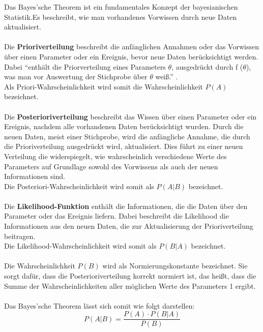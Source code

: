 \documentclass[a4paper,12pt]{article}
\begin{document}
Das Bayes'sche Theorem ist ein fundamentales Konzept der bayesianischen Statistik.Es beschreibt, wie man vorhandenes Vorwissen durch neue Daten aktualisiert. \\\\
Die \textbf{Prioriverteilung} beschreibt die anfänglichen Annahmen oder das Vorwissen über einen 
Parameter oder ein Ereignis, bevor neue Daten berücksichtigt werden.
Dabei ``enthält die Priorverteilung eines Parameters $\theta$, ausgedrückt durch f ($ \theta $), 
was man vor Auswertung der Stichprobe über $\theta$ weiß.'' \parencite[90]{StatistikKlassischOderBayes}. \\
Als Priori-Wahrscheinlichkeit wird somit die Wahrscheinlichkeit $ P(A) $ bezeichnet. \\\\
Die \textbf{Posterioriverteilung} beschreibt das Wissen über einen Parameter oder ein Ereignis, nachdem alle 
vorhandenen Daten berücksichtigt wurden. Durch die neuen Daten, meist einer Stichprobe, wird die 
anfängliche Annahme, die durch die Prioriverteilung ausgedrückt wird, aktualisiert. 
Dies führt zu einer neuen Verteilung die widerspiegelt, wie wahrscheinlich verschiedene Werte 
des Parameters auf Grundlage sowohl des Vorwissens als auch der neuen Informationen sind. \parencite[109]{StatistikKlassischOderBayes}\\
Die Posteriori-Wahrscheinlichkeit wird somit als $ P(A|B) $ bezeichnet. \\\\
Die \textbf{Likelihood-Funktion} enthält die Informationen, die die Daten über den Parameter oder das Ereignis liefern.
Dabei beschreibt die Likelihood die Informationen aus den neuen Daten, die zur Aktualisierung der Prioriverteilung beitragen. \parencite[88]{StatistikKlassischOderBayes}\\
Die Likelihood-Wahrscheinlichkeit wird somit als $ P(B|A) $ bezeichnet. \\\\
Die Wahrscheinlichkeit $ P(B) $ wird als Normierungskonstante bezeichnet. Sie sorgt dafür, 
dass die Posterioriverteilung korrekt normiert ist, das heißt, dass die Summe der 
Wahrscheinlichkeiten aller möglichen Werte des Parameters 1 ergibt. \parencite[109]{StatistikKlassischOderBayes} \\\\
Das Bayes'sche Theorem lässt sich somit wie folgt darstellen:
\begin{equation}
P(A|B) = \frac{P(A) \cdot P(B|A)}{P(B)}
\end{equation}
\end{document}
